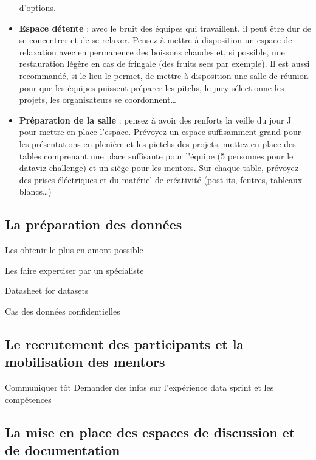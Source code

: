 \documentclass[]{book}
\begin{document}
\begin{itemize}
  d'options.
\item
  \textbf{Espace détente} : avec le bruit des équipes qui travaillent,
  il peut être dur de se concentrer et de se relaxer. Pensez à mettre à
  disposition un espace de relaxation avec en permanence des boissons
  chaudes et, si possible, une restauration légère en cas de fringale
  (des fruits secs par exemple). Il est aussi recommandé, si le lieu le
  permet, de mettre à disposition une salle de réunion pour que les
  équipes puissent préparer les pitchs, le jury sélectionne les projets,
  les organisateurs se coordonnent\ldots{}
\item
  \textbf{Préparation de la salle} : pensez à avoir des renforts la
  veille du jour J pour mettre en place l'espace. Prévoyez un espace
  suffisamment grand pour les présentations en plenière et les pictchs
  des projets, mettez en place des tables comprenant une place
  suffisante pour l'équipe (5 personnes pour le dataviz challenge) et un
  siège pour les mentors. Sur chaque table, prévoyez des prises
  éléctriques et du matériel de créativité (post-its, feutres, tableaux
  blancs\ldots{})
\end{itemize}

\subsection{La préparation des
données}\label{la-preparation-des-donnees}

Les obtenir le plus en amont possible

Les faire expertiser par un spécialiste

Datasheet for datasets

Cas des données confidentielles

\subsection{Le recrutement des participants et la mobilisation des
mentors}\label{le-recrutement-des-participants-et-la-mobilisation-des-mentors}

Communiquer tôt Demander des infos sur l'expérience data sprint et les
compétences

\subsection{La mise en place des espaces de discussion et de
documentation}\label{la-mise-en-place-des-espaces-de-discussion-et-de-documentation}
\end{document}
